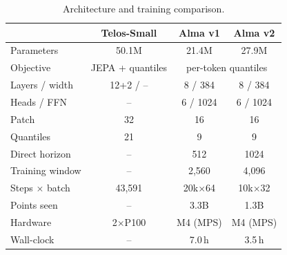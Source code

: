 \documentclass[10pt,twocolumn]{extarticle}
\begin{document}
\begin{table}[t]
\centering\small
\caption{Architecture and training comparison.}
\label{tab:arch}
\setlength{\tabcolsep}{3pt}
\begin{tabular}{@{}lccc@{}}
\toprule
 & Telos-Small & Alma v1 & Alma v2 \\
\midrule
Parameters        & 50.1M & 21.4M & 27.9M \\
Objective         & JEPA + quantiles & \multicolumn{2}{c}{per-token quantiles} \\
Layers / width    & 12+2 / -- & 8 / 384 & 8 / 384 \\
Heads / FFN       & -- & 6 / 1024 & 6 / 1024 \\
Patch             & 32 & 16 & 16 \\
Quantiles         & 21 & 9 & 9 \\
Direct horizon    & -- & 512 & 1024 \\
Training window   & -- & 2{,}560 & 4{,}096 \\
Steps $\times$ batch & 43{,}591 & 20k$\times$64 & 10k$\times$32 \\
Points seen       & -- & 3.3B & 1.3B \\
Hardware          & 2$\times$P100 & M4 (MPS) & M4 (MPS) \\
Wall-clock        & -- & 7.0\,h & 3.5\,h \\
\bottomrule
\end{tabular}
\end{table}
\end{document}
